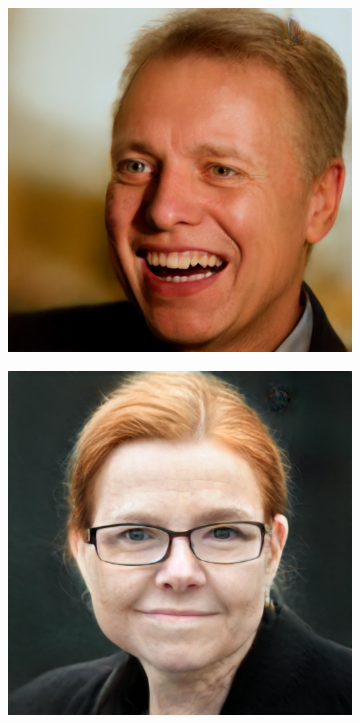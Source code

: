 \begin{figure}[h!]
\begin{subfigure}[b]{0.24\textwidth}
    \end{subfigure}
    \begin{subfigure}[b]{0.24\textwidth}
        \includegraphics[width=\textwidth]{fig/stylegan/faceedit/uffe-smile}

    \end{subfigure}

    \begin{subfigure}[b]{0.24\textwidth}
        \includegraphics[width=\textwidth]{fig/stylegan/faceedit/inger-glasses}


\end{subfigure}
\end{figure}
